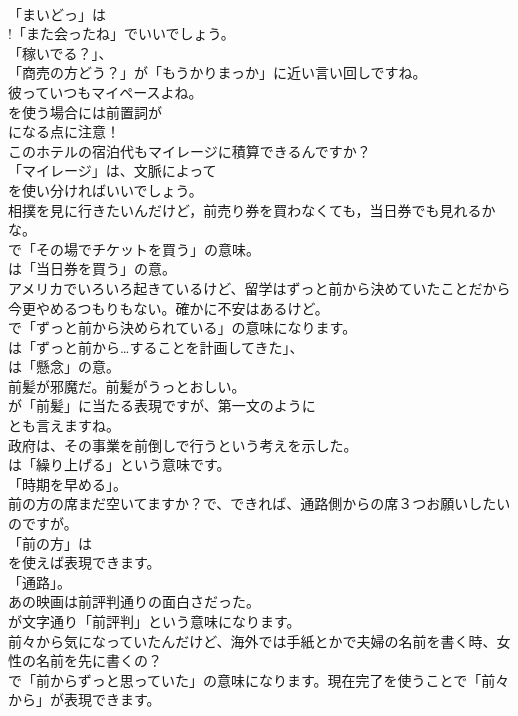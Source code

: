 \documentclass[8pt]{extreport}
\begin{document}
\begin{CJK}{UTF8}{min}
\\	「まいどっ」は
\\	!「また会ったね」でいいでしょう。
\\	「稼いでる？」、
\\	「商売の方どう？」が「もうかりまっか」に近い言い回しですね。	
\\	彼っていつもマイペースよね。 
\\	を使う場合には前置詞が
\\	になる点に注意！	
\\	このホテルの宿泊代もマイレージに積算できるんですか？ 
\\	「マイレージ」は、文脈によって
\\	を使い分ければいいでしょう。	
\\	相撲を見に行きたいんだけど，前売り券を買わなくても，当日券でも見れるかな。 
\\	で「その場でチケットを買う」の意味。
\\	は「当日券を買う」の意。	
\\	アメリカでいろいろ起きているけど、留学はずっと前から決めていたことだから今更やめるつもりもない。確かに不安はあるけど。 
\\	で「ずっと前から決められている」の意味になります。
\\	は「ずっと前から…することを計画してきた」、
\\	は「懸念」の意。	
\\	前髪が邪魔だ。前髪がうっとおしい。 
\\	が「前髪」に当たる表現ですが、第一文のように
\\	とも言えますね。	
\\	政府は、その事業を前倒しで行うという考えを示した。 
\\	は「繰り上げる」という意味です。
\\	「時期を早める」。	
\\	前の方の席まだ空いてますか？で、できれば、通路側からの席３つお願いしたいのですが。 
\\	「前の方」は
\\	を使えば表現できます。
\\	「通路」。	
\\	あの映画は前評判通りの面白さだった。 
\\	が文字通り「前評判」という意味になります。	
\\	前々から気になっていたんだけど、海外では手紙とかで夫婦の名前を書く時、女性の名前を先に書くの？ 
\\	で「前からずっと思っていた」の意味になります。現在完了を使うことで「前々から」が表現できます。	

\end{CJK}
\end{document}
